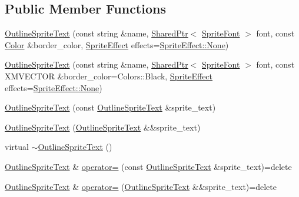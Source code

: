 \subsection*{Public Member Functions}
\begin{DoxyCompactItemize}
\item 
\hyperlink{classmage_1_1_outline_sprite_text_a20863727c984b3765c2282d1e50047ea}{Outline\+Sprite\+Text} (const string \&name, \hyperlink{namespacemage_a1e01ae66713838a7a67d30e44c67703e}{Shared\+Ptr}$<$ \hyperlink{classmage_1_1_sprite_font}{Sprite\+Font} $>$ font, const \hyperlink{structmage_1_1_color}{Color} \&border\+\_\+color, \hyperlink{namespacemage_a9cfe18123066ba4236f548f9de75d881}{Sprite\+Effect} effects=\hyperlink{namespacemage_a9cfe18123066ba4236f548f9de75d881a6adf97f83acf6453d4a6a4b1070f3754}{Sprite\+Effect\+::\+None})
\item 
\hyperlink{classmage_1_1_outline_sprite_text_a8a6872c31f2538754b65445497fb50f4}{Outline\+Sprite\+Text} (const string \&name, \hyperlink{namespacemage_a1e01ae66713838a7a67d30e44c67703e}{Shared\+Ptr}$<$ \hyperlink{classmage_1_1_sprite_font}{Sprite\+Font} $>$ font, const X\+M\+V\+E\+C\+T\+OR \&border\+\_\+color=Colors\+::\+Black, \hyperlink{namespacemage_a9cfe18123066ba4236f548f9de75d881}{Sprite\+Effect} effects=\hyperlink{namespacemage_a9cfe18123066ba4236f548f9de75d881a6adf97f83acf6453d4a6a4b1070f3754}{Sprite\+Effect\+::\+None})
\item 
\hyperlink{classmage_1_1_outline_sprite_text_a15be7f23a00e893314b905d5385903c5}{Outline\+Sprite\+Text} (const \hyperlink{classmage_1_1_outline_sprite_text}{Outline\+Sprite\+Text} \&sprite\+\_\+text)
\item 
\hyperlink{classmage_1_1_outline_sprite_text_a86bb6e1637bcc71a4272f193466669e2}{Outline\+Sprite\+Text} (\hyperlink{classmage_1_1_outline_sprite_text}{Outline\+Sprite\+Text} \&\&sprite\+\_\+text)
\item 
virtual \hyperlink{classmage_1_1_outline_sprite_text_ae4d77ebb3f5bac4fd02b148d6173d10f}{$\sim$\+Outline\+Sprite\+Text} ()
\item 
\hyperlink{classmage_1_1_outline_sprite_text}{Outline\+Sprite\+Text} \& \hyperlink{classmage_1_1_outline_sprite_text_a324ec8e5c0d319b449895cc45d6b3807}{operator=} (const \hyperlink{classmage_1_1_outline_sprite_text}{Outline\+Sprite\+Text} \&sprite\+\_\+text)=delete
\item 
\hyperlink{classmage_1_1_outline_sprite_text}{Outline\+Sprite\+Text} \& \hyperlink{classmage_1_1_outline_sprite_text_a3549e97af5461728a399f01af9125486}{operator=} (\hyperlink{classmage_1_1_outline_sprite_text}{Outline\+Sprite\+Text} \&\&sprite\+\_\+text)=delete

\end{DoxyCompactItemize}
